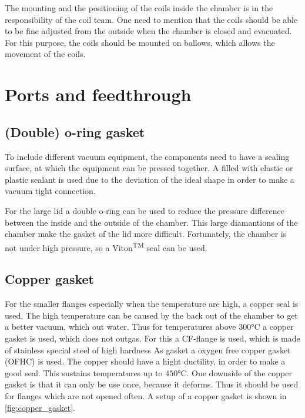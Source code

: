 The mounting and the positioning of the coils inside the chamber is in the responsibility of the coil team.
One need to mention that the coils should be able to be fine adjusted from the outside when the chamber is closed and evacuated.
For this purpose, the coils should be mounted on ballows, which allows the movement of the coils.


\section{Ports and feedthrough}

\subsection{(Double) o-ring gasket}

To include different vacuum equipment, the components need to have a sealing surface, at which the equipment can be pressed together.
A filled with elastic or plastic sealant is used due to the deviation of the ideal shape in order to make a vacuum tight connection. \cite{Wutz2000}

For the large lid a double o-ring can be used to reduce the pressure difference between the inside and the outside of the chamber.
This large diamantions of the chamber make the gasket of the lid more difficult.
Fortunately, the chamber is not under high pressure, so a Viton\textsuperscript{TM} seal can be used.


\subsection{Copper gasket}
For the smaller flanges especially when the temperature are high, a copper seal is used.
The high temperature can be caused by the back out of the chamber to get a better vacuum, which out water.
Thus for temperatures above $300\si{\degreeCelsius}$ a copper gasket is used, which does not outgas.
For this a CF-flange is used, which is made of stainless special steel of high hardness
As gasket a oxygen free copper gasket (OFHC) is used.
The copper should have a hight ductility, in order to make a good seal.
This sustains temperatures up to $450\si{\degreeCelsius}$.
One downside of the copper gasket is that it can only be use once, because it deforms.
Thus it should be used for flanges which are not opened often.\cite{Wutz2000}
A setup of a copper gasket is shown in \autoref{fig:copper_gasket}.

